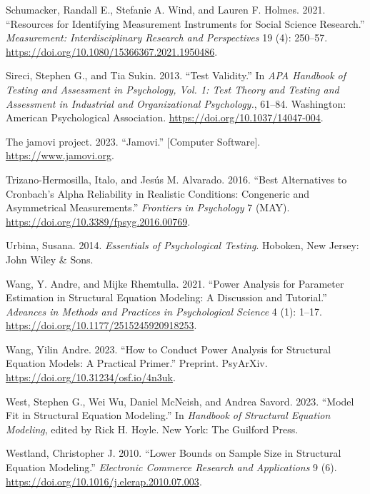 \documentclass[
  a4paper,
]{article}
\newlength{\cslhangindent}
\newenvironment{CSLReferences}[2] %
 {\begin{list}{}{%
  \setlength{\itemindent}{0pt}
  \setlength{\leftmargin}{0pt}
  \setlength{\parsep}{0pt}
  \ifodd #1
   \setlength{\leftmargin}{\cslhangindent}
   \setlength{\itemindent}{-1\cslhangindent}
  \fi
  \setlength{\itemsep}{#2\baselineskip}}}
 {\end{list}}
\begin{document}
\begin{CSLReferences}{1}{0}
Schumacker, Randall E., Stefanie A. Wind, and Lauren F. Holmes. 2021.
{``Resources for {Identifying Measurement Instruments} for {Social
Science Research}.''} \emph{Measurement: Interdisciplinary Research and
Perspectives} 19 (4): 250--57.
\url{https://doi.org/10.1080/15366367.2021.1950486}.

Sireci, Stephen G., and Tia Sukin. 2013. {``Test Validity.''} In
\emph{{APA} Handbook of Testing and Assessment in Psychology, {Vol}. 1:
{Test} Theory and Testing and Assessment in Industrial and
Organizational Psychology.}, 61--84. Washington: American Psychological
Association. \url{https://doi.org/10.1037/14047-004}.

The jamovi project. 2023. {``Jamovi.''} {[}Computer Software{]}.
\url{https://www.jamovi.org}.

Trizano-Hermosilla, Italo, and Jesús M. Alvarado. 2016. {``Best
Alternatives to {Cronbach}'s Alpha Reliability in Realistic Conditions:
{Congeneric} and Asymmetrical Measurements.''} \emph{Frontiers in
Psychology} 7 (MAY). \url{https://doi.org/10.3389/fpsyg.2016.00769}.

Urbina, Susana. 2014. \emph{Essentials of {Psychological Testing}}.
Hoboken, New Jersey: John Wiley \& Sons.

Wang, Y. Andre, and Mijke Rhemtulla. 2021. {``Power {Analysis} for
{Parameter Estimation} in {Structural Equation Modeling}: {A Discussion}
and {Tutorial}.''} \emph{Advances in Methods and Practices in
Psychological Science} 4 (1): 1--17.
\url{https://doi.org/10.1177/2515245920918253}.

Wang, Yilin Andre. 2023. {``How to {Conduct Power Analysis} for
{Structural Equation Models}: {A Practical Primer}.''} Preprint.
PsyArXiv. \url{https://doi.org/10.31234/osf.io/4n3uk}.

West, Stephen G., Wei Wu, Daniel McNeish, and Andrea Savord. 2023.
{``Model {Fit} in {Structural Equation Modeling}.''} In \emph{Handbook
of {Structural Equation Modeling}}, edited by Rick H. Hoyle. New York:
The Guilford Press.

Westland, Christopher J. 2010. {``Lower Bounds on Sample Size in
Structural Equation Modeling.''} \emph{Electronic Commerce Research and
Applications} 9 (6). \url{https://doi.org/10.1016/j.elerap.2010.07.003}.


\end{CSLReferences}
\end{document}
